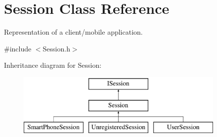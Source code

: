 \hypertarget{class_session}{\section{Session Class Reference}
\label{class_session}
}


Representation of a client/mobile application.  




{\ttfamily \#include $<$Session.\-h$>$}

Inheritance diagram for Session\-:\begin{figure}[H]
\begin{center}
\leavevmode
\includegraphics[height=3.000000cm]{class_session}
\end{center}
\end{figure}
